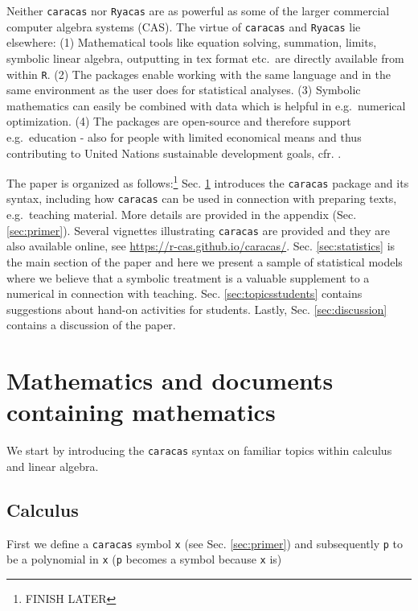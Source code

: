 \documentclass[10pt,]{article}
\begin{document}
Neither \texttt{caracas} nor \texttt{Ryacas} are as powerful as some of
the larger commercial computer algebra systems (CAS). The virtue of
\texttt{caracas} and \texttt{Ryacas} lie elsewhere: (1) Mathematical
tools like equation solving, summation, limits, symbolic linear algebra,
outputting in tex format etc.~are directly available from within
\texttt{R}. (2) The packages enable working with the same language and
in the same environment as the user does for statistical analyses. (3)
Symbolic mathematics can easily be combined with data which is helpful
in e.g.~numerical optimization. (4) The packages are open-source and
therefore support e.g.~education - also for people with limited
economical means and thus contributing to United Nations sustainable
development goals, cfr. \citep{UN17}.

The paper is organized as follows:\footnote{FINISH LATER} Sec.
\ref{sec:mathintro} introduces the \texttt{caracas} package and its
syntax, including how \texttt{caracas} can be used in connection with
preparing texts, e.g.~teaching material. More details are provided in
the appendix (Sec. \ref{sec:primer}). Several vignettes illustrating
\texttt{caracas} are provided and they are also available online, see
\url{https://r-cas.github.io/caracas/}. Sec. \ref{sec:statistics} is the
main section of the paper and here we present a sample of statistical
models where we believe that a symbolic treatment is a valuable
supplement to a numerical in connection with teaching. Sec.
\ref{sec:topicsstudents} contains suggestions about hand-on activities
for students. Lastly, Sec. \ref{sec:discussion} contains a discussion of
the paper.

\hypertarget{sec:mathintro}{%
\section{Mathematics and documents containing
mathematics}\label{sec:mathintro}}

We start by introducing the \texttt{caracas} syntax on familiar topics
within calculus and linear algebra.

\hypertarget{calculus}{%
\subsection{Calculus}\label{calculus}}

First we define a \texttt{caracas} symbol \texttt{x} (see Sec.
\ref{sec:primer}) and subsequently \texttt{p} to be a polynomial in
\texttt{x} (\texttt{p} becomes a symbol because \texttt{x} is)
\end{document}
